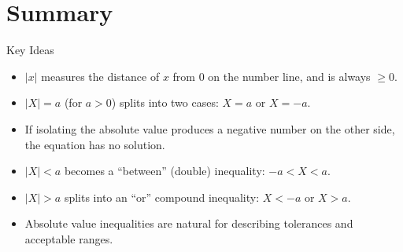 \documentclass[12pt]{article}
\begin{document}
  

\section*{Summary}

\begin{friendlyrule}{Key Ideas}
\begin{itemize}
    \item $|x|$ measures the distance of $x$ from $0$ on the number line, and is always $\ge 0$.
    \item $|X|=a$ (for $a>0$) splits into two cases: $X=a$ or $X=-a$.
    \item If isolating the absolute value produces a negative number on the other side, the equation has no solution.
    \item $|X|<a$ becomes a ``between'' (double) inequality: $-a<X<a$.
    \item $|X|>a$ splits into an ``or'' compound inequality: $X<-a$ or $X>a$.
    \item Absolute value inequalities are natural for describing tolerances and acceptable ranges.
\end{itemize}
\end{friendlyrule}
\end{document}
